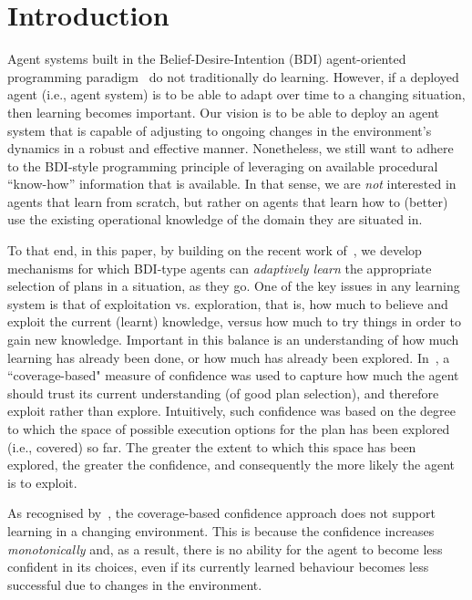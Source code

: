\section{Introduction}\label{sec:introduction}

Agent systems built in the Belief-Desire-Intention (BDI)
agent-oriented programming
paradigm~\cite{Georgeff89-PRS,Rao96:AgentSpeak,WooldridgeBook} do not
traditionally do learning.  
However, if a deployed agent (i.e., agent system) is to be able to
adapt over time to a changing situation, then learning becomes
important. Our vision is to be able to deploy an agent system that is
capable of adjusting to ongoing changes in the environment's dynamics
in a robust and effective manner. Nonetheless, we still want to adhere
to the BDI-style programming principle of leveraging on available
procedural ``know-how'' information that is available. In that sense,
we are \emph{not} interested in agents that learn from scratch, but
rather on agents that learn how to (better) use the existing
operational knowledge of the domain they are situated in.  



To that end, in this paper, by building on the recent work of~\cite{airiau09:enhancing,singh10:extending,singh10:learning}, we develop mechanisms for which BDI-type agents can \emph{adaptively learn} the appropriate selection of plans in a situation, as they go. 
One of the key issues in any learning system is that of exploitation vs. exploration, that is, how much to believe and exploit the current (learnt) knowledge, versus how much to try things in order to gain new knowledge. Important in this balance is an understanding of how much learning has already been done, or how much has already been explored. In~\cite{singh10:extending,singh10:learning}, a ``coverage-based" measure of confidence was used to capture how much the agent should trust its current understanding (of good plan selection), and therefore exploit rather than explore. Intuitively, such confidence was based on the degree to which the space of possible execution options for the plan has been explored (i.e., covered) so far. The greater the extent to which this space has been explored, the greater the confidence, and consequently the more likely the agent is to exploit.  

As recognised by~\cite{singh10:learning}, the coverage-based confidence approach does not support learning in a changing environment. This is because the confidence increases \emph{monotonically} and, as a result, there is no ability for the agent to become less confident in its choices, even if its currently learned behaviour becomes less successful due to changes in the environment.



